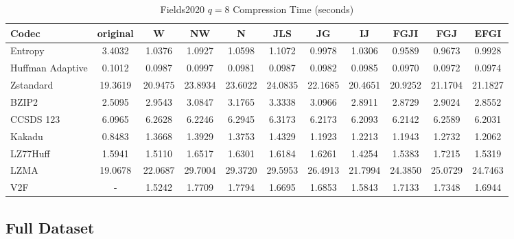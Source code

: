 \documentclass{article}
\begin{document}
\begin{table}[h!]
\centering
\caption{Fields2020 $q=8$ Compression Time (seconds)}
\begin{tabular}{|l|cccccccccc|}
\hline
Codec &  original &       W &      NW &       N &     JLS &      JG &      IJ &    FGJI &     FGJ &    EFGI \\
\hline
Entropy & 3.4032 & 1.0376 & 1.0927 & 1.0598 & 1.1072 & 0.9978 & 1.0306 & 0.9589 & 0.9673 & 0.9928         \\
\hline
Huffman Adaptive &    0.1012 &  0.0987 &  0.0997 &  0.0981 &  0.0987 &  0.0982 &  0.0985 &  0.0970 &  0.0972 &  0.0974 \\
Zstandard        &   19.3619 & 20.9475 & 23.8934 & 23.6022 & 24.0835 & 22.1685 & 20.4651 & 20.9252 & 21.1704 & 21.1827 \\
BZIP2            &    2.5095 &  2.9543 &  3.0847 &  3.1765 &  3.3338 &  3.0966 &  2.8911 &  2.8729 &  2.9024 &  2.8552 \\
CCSDS 123        &    6.0965 &  6.2628 &  6.2246 &  6.2945 &  6.3173 &  6.2173 &  6.2093 &  6.2142 &  6.2589 &  6.2031 \\
Kakadu           &    0.8483 &  1.3668 &  1.3929 &  1.3753 &  1.4329 &  1.1923 &  1.2213 &  1.1943 &  1.2732 &  1.2062 \\
LZ77Huff         &    1.5941 &  1.5110 &  1.6517 &  1.6301 &  1.6184 &  1.6261 &  1.4254 &  1.5383 &  1.7215 &  1.5319 \\
LZMA             &   19.0678 & 22.0687 & 29.7004 & 29.3720 & 29.5953 & 26.4913 & 21.7994 & 24.3850 & 25.0729 & 24.7463 \\
V2F              &    - &  1.5242 &  1.7709 &  1.7794 &  1.6695 &  1.6853 &  1.5843 &  1.7133 &  1.7348 &  1.6944 \\
\hline
\end{tabular}
\end{table}

\newpage
\subsection{Full Dataset}
\end{document}
